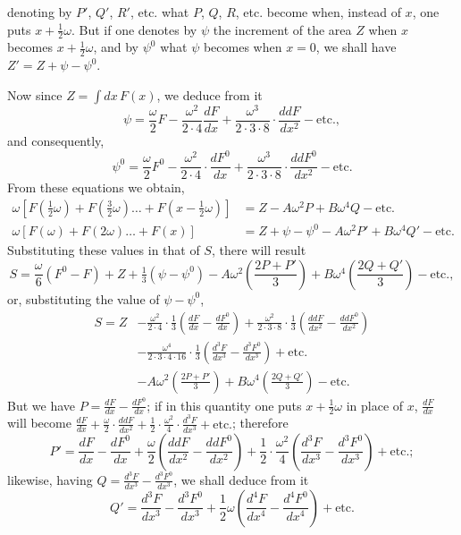 \documentclass{article}
\begin{document}
denoting by $P'$, $Q'$, $R'$, etc. what $P$, $Q$, $R$, etc. become when, instead of $x$, one puts $x+\frac{1}{2}\omega$. But if one denotes by $\psi$ the increment of the area $Z$ when $x$ becomes $x+\frac{1}{2}\omega$, and by $\psi^{0}$ what $\psi$ becomes when $x=0$, we shall have $Z'=Z+\psi-\psi^{0}$.

Now since $Z=\displaystyle\int dx\,F(x)$, we deduce from it
\[ \psi=\frac{\omega}{2}F-\frac{\omega^{2}}{2\cdot4}\frac{dF}{dx}+\frac{\omega^{3}}{2\cdot3\cdot8}\cdot\frac{ddF}{dx^{2}}-\text{etc.}, \]
and consequently,
\[ \psi^{0}=\frac{\omega}{2}F^{0}-\frac{\omega^{2}}{2\cdot4}\cdot\frac{dF^{0}}{dx}+\frac{\omega^{3}}{2\cdot3\cdot8}\cdot\frac{ddF^{0}}{dx^{2}}-\text{etc.} \]
From these equations we obtain,
\[ \begin{aligned} \omega[F(\tfrac{1}{2}\omega)+F(\tfrac{3}{2}\omega)\ldots+F(x-\tfrac{1}{2}\omega)]&=Z-A\omega^{2}P+B\omega^{4}Q-\text{etc.}\\ \omega[F(\omega)+F(2\omega)\ldots+F(x)]&=Z+\psi-\psi^{0}-A\omega^{2}P'+B\omega^{4}Q'-\text{etc.} \end{aligned} \]
Substituting these values in that of $S$, there will result
\[ S=\frac{\omega}{6}(F^{0}-F)+Z+\tfrac{1}{3}(\psi-\psi^{0})-A\omega^{2}\left(\frac{2P+P'}{3}\right)+B\omega^{4}\left(\frac{2Q+Q'}{3}\right)-\text{etc.}, \]
or, substituting the value of $\psi-\psi^{0}$,
\[ \begin{aligned} S=Z&-\frac{\omega^{2}}{2\cdot4}\cdot\frac{1}{3}\left(\frac{dF}{dx}-\frac{dF^{0}}{dx}\right)+\frac{\omega^{2}}{2\cdot3\cdot8}\cdot\frac{1}{3}\left(\frac{ddF}{dx^{2}}-\frac{ddF^{0}}{dx^{2}}\right)\\ &-\frac{\omega^{4}}{2\cdot3\cdot4\cdot16}\cdot\frac{1}{3}\left(\frac{d^{3}F}{dx^{3}}-\frac{d^{3}F^{0}}{dx^{3}}\right)+\text{etc.}\\ &-A\omega^{2}\left(\frac{2P+P'}{3}\right)+B\omega^{4}\left(\frac{2Q+Q'}{3}\right)-\text{etc.} \end{aligned} \]
But we have $P=\frac{dF}{dx}-\frac{dF^{0}}{dx}$; if in this quantity one puts $x+\frac{1}{2}\omega$ in place of $x$, $\frac{dF}{dx}$ will become $\frac{dF}{dx}+\frac{\omega}{2}\cdot\frac{ddF}{dx^{2}}+\frac{1}{2}\cdot\frac{\omega^{2}}{4}\cdot\frac{d^{3}F}{dx^{3}}+\text{etc.}$; therefore
\[ P'=\frac{dF}{dx}-\frac{dF^{0}}{dx}+\frac{\omega}{2}\left(\frac{ddF}{dx^{2}}-\frac{ddF^{0}}{dx^{2}}\right)+\frac{1}{2}\cdot\frac{\omega^{2}}{4}\left(\frac{d^{3}F}{dx^{3}}-\frac{d^{3}F^{0}}{dx^{3}}\right)+\text{etc.}; \]
likewise, having $Q=\frac{d^{3}F}{dx^{3}}-\frac{d^{3}F^{0}}{dx^{3}}$, we shall deduce from it
\[ Q'=\frac{d^{3}F}{dx^{3}}-\frac{d^{3}F^{0}}{dx^{3}}+\frac{1}{2}\omega\left(\frac{d^{4}F}{dx^{4}}-\frac{d^{4}F^{0}}{dx^{4}}\right)+\text{etc.} \]
\end{document}
